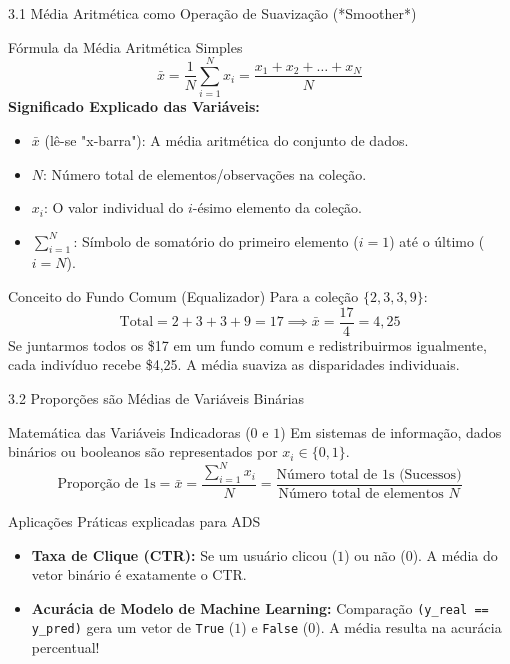 \documentclass[10pt, aspectratio=169]{beamer}
\begin{document}
\begin{frame}{3.1 Média Aritmética como Operação de Suavização (*Smoother*)}
	\vspace{-0.2cm}
    \begin{block}{Fórmula da Média Aritmética Simples}
        \[ \bar{x} = \frac{1}{N} \sum_{i=1}^N x_i = \frac{x_1 + x_2 + \dots + x_N}{N} \]
        \textbf{Significado Explicado das Variáveis:}
        \begin{itemize}
            \item $\bar{x}$ (lê-se "x-barra"): A média aritmética do conjunto de dados.
            \item $N$: Número total de elementos/observações na coleção.
            \item $x_i$: O valor individual do $i$-ésimo elemento da coleção.
            \item $\sum_{i=1}^N$: Símbolo de somatório do primeiro elemento ($i=1$) até o último ($i=N$).
        \end{itemize}
    \end{block}
    \begin{exampleblock}{Conceito do Fundo Comum (Equalizador)}
        Para a coleção $\{2, 3, 3, 9\}$:
        \vspace{-0.4cm}
        \[ \text{Total} = 2 + 3 + 3 + 9 = 17 \implies \bar{x} = \frac{17}{4} = 4{,}25 \]
        Se juntarmos todos os \$17 em um fundo comum e redistribuirmos igualmente, cada indivíduo recebe \$4,25. A média suaviza as disparidades individuais.
    \end{exampleblock}
\end{frame}

\begin{frame}{3.2 Proporções são Médias de Variáveis Binárias}
    \begin{block}{Matemática das Variáveis Indicadoras ($0$ e $1$)}
        Em sistemas de informação, dados binários ou booleanos são representados por $x_i \in \{0, 1\}$.
        \[ \text{Proporção de 1s} = \bar{x} = \frac{\sum_{i=1}^N x_i}{N} = \frac{\text{Número total de 1s (Sucessos)}}{\text{Número total de elementos } N} \]
    \end{block}

    \vspace{0.2cm}

    \begin{exampleblock}{Aplicações Práticas explicadas para ADS}
        \begin{itemize}
            \item \textbf{Taxa de Clique (CTR):} Se um usuário clicou ($1$) ou não ($0$). A média do vetor binário é exatamente o CTR.
            \item \textbf{Acurácia de Modelo de Machine Learning:} Comparação \texttt{(y\_real == y\_pred)} gera um vetor de \texttt{True} ($1$) e \texttt{False} ($0$). A média resulta na acurácia percentual!
        \end{itemize}
    \end{exampleblock}
\end{frame}
\end{document}
